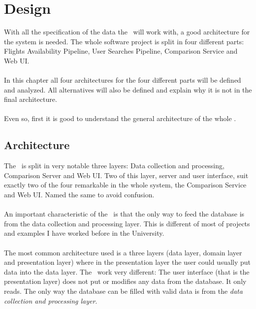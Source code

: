 
\chapter{Design}

\label{chapter01}

With all the specification of the data the \thesis\ will work with, a good architecture for the system is needed. The whole software project is split in four different parts: Flights Availability Pipeline, User Searches Pipeline, Comparison Service and Web UI.
\\\\
In this chapter all four architectures for the four different parts will be defined and analyzed. All alternatives will also be defined and explain why it is not in the final architecture.
\\\\
Even so, first it is good to understand the general architecture of the whole \thesis.


\section{Architecture}

The \thesis\ is split in very notable three layers: Data collection and processing, Comparison Server and Web UI. Two of this layer, server and user interface, suit exactly two of the four remarkable in the whole system, the Comparison Service and Web UI. Named the same to avoid confusion.
\\\\
An important characteristic of the \thesis\ is that the only way to feed the database is from the data collection and processing layer. This is different of most of projects and examples I have worked before in the University.
\\\\
The most common architecture used is a three layers (data layer, domain layer and presentation layer) where in the presentation layer the user could usually put data into the data layer. The \thesis\ work very different: The user interface (that is the presentation layer) does not put or modifies any data from the database. It only reads. The only way the database can be filled with valid data is from the \textit{data collection and processing layer}.

